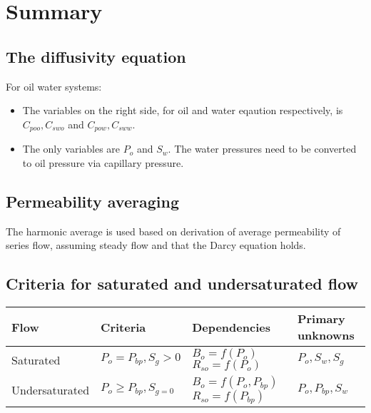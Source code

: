 
\section{Summary} %
\label{sec:summary}

\subsection{The diffusivity equation} %
\label{sub:the_diffusivity_equation}

For oil water systems:
\begin{itemize}
  \item The variables on the right side, for oil and water eqaution respectively, is $C_{poo}, C_{swo}$ and $C_{pow}, C_{sww}$.
  \item The only variables are $P_o$ and $S_w$. The water pressures need to be converted to oil pressure via capillary pressure.
\end{itemize}


\subsection{Permeability averaging} %
\label{sub:permeability_averaging}
The harmonic average is used based on derivation of average permeability of series flow, assuming steady flow and that the Darcy equation holds.


\subsection{Criteria for saturated and undersaturated flow} %
\label{sub:criteria_for_saturated_and_undersaturated_flow}

\begin{tabular}{l|lll}
\toprule
Flow & Criteria & Dependencies & Primary unknowns \\
\midrule
Saturated & $P_o = P_{bp}, S_g >0$ & \parbox[t]{4cm}{$ B_o = f(P_o)$ \\ $R_{so} = f(P_o)$} & $P_o,S_w,S_g$ \\
\midrule
Undersaturated & $P_o \geq P_{bp}, S_{g=0}$ & \parbox[t]{4cm}{$ B_o = f(P_o,P_{bp})$ \\ $R_{so} = f(P_{bp})$} & $P_o, P_{bp}, S_w$ \\
\bottomrule
\end{tabular}

